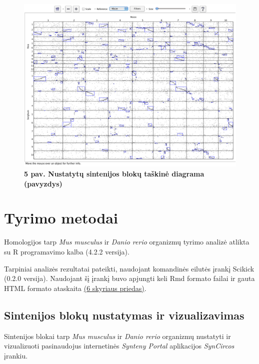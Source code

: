 \documentclass[12pt]{article}
\begin{document}
\begin{figure}[htb]
    \begin{center}
        \includegraphics[width=0.8\linewidth]{../Figures/Synteny_dotplot_example.png}
        \vspace{-0.5\baselineskip}
        \caption*{\small\textbf{5 pav. Nustatytų sintenijos blokų taškinė
        diagrama (pavyzdys)}}
        \label{fig:birds}
    \end{center}
\end{figure}

\newpage


\section{Tyrimo metodai}
Homologijos tarp \emph{Mus musculus} ir \emph{Danio rerio} organizmų tyrimo
analizė atlikta su R programavimo kalba\cite{R} (4.2.2 versija).

Tarpiniai analizės rezultatai pateikti, naudojant komandinės eilutės įrankį
Scikick\cite{SCIK} (0.2.0 versija). Naudojant šį įrankį buvo apjungti keli Rmd
formato failai ir gauta HTML formato ataskaita \hyperref[Priedas]{(6 skyriaus
priedas)}.

\subsection{Sintenijos blokų nustatymas ir vizualizavimas}
Sintenijos blokai tarp \emph{Mus musculus} ir \emph{Danio rerio} organizmų
nustatyti ir vizualizuoti pasinaudojus internetinės
\emph{Synteny Portal}\cite{SYN_PORT} aplikacijos \emph{SynCircos} įrankiu.
\end{document}
